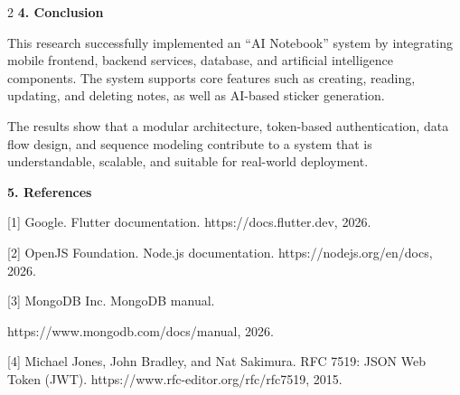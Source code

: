 \begin{multicols}{2}
\textbf{4. Conclusion}

This research successfully implemented an “AI Notebook” system by integrating mobile frontend,
backend services, database, and artificial intelligence components. The system supports core features
such as creating, reading, updating, and deleting notes, as well as AI-based sticker generation.

The results show that a modular architecture, token-based authentication, data flow design,
and sequence modeling contribute to a system that is understandable, scalable, and suitable for real-world deployment.

\textbf{5. References}

[1] Google. Flutter documentation.
https://docs.flutter.dev, 2026.

[2] OpenJS Foundation. Node.js documentation.
https://nodejs.org/en/docs, 2026.

[3] MongoDB Inc. MongoDB manual.

https://www.mongodb.com/docs/manual, 2026.

[4] Michael Jones, John Bradley, and Nat Sakimura.
RFC 7519: JSON Web Token (JWT).
https://www.rfc-editor.org/rfc/rfc7519, 2015.

\end{multicols}